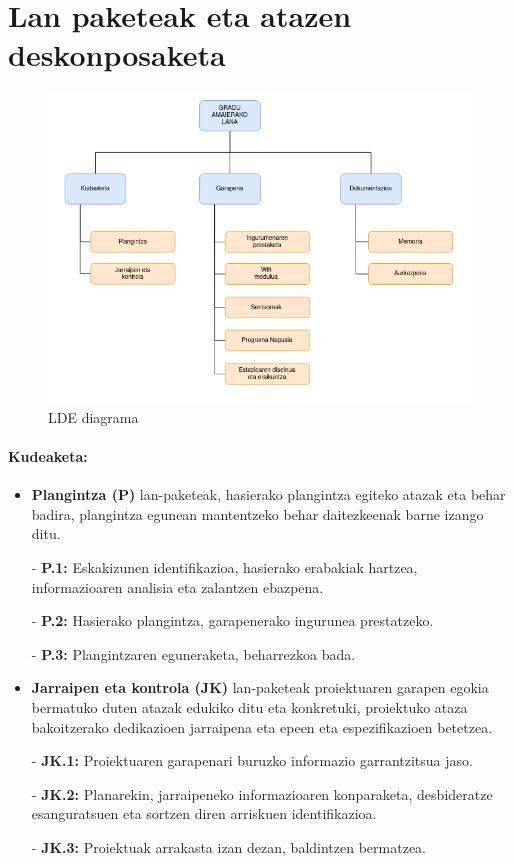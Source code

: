 \newpage
\section{Lan paketeak eta atazen deskonposaketa}

\begin{figure}[htb]
	\centering
	\includegraphics[width=.99\linewidth]{images/LDE3.png}
	\caption{\label{fig:lde} LDE diagrama}
\end{figure}

\paragraph{\textbf{Kudeaketa:}}
\begin{itemize}
    \item \textbf{Plangintza (P)} lan-paketeak, hasierako plangintza egiteko atazak eta behar badira, plangintza egunean mantentzeko behar daitezkeenak barne izango ditu.
    
        - \textbf{P.1:} Eskakizunen identifikazioa, hasierako erabakiak hartzea, informazioaren analisia eta zalantzen ebazpena. 
        
        - \textbf{P.2:} Hasierako plangintza, garapenerako ingurunea prestatzeko.
        
        - \textbf{P.3:} Plangintzaren eguneraketa, beharrezkoa bada.
    
    \item \textbf{Jarraipen eta kontrola (JK)} lan-paketeak proiektuaren garapen egokia bermatuko duten
atazak edukiko ditu eta konkretuki, proiektuko ataza bakoitzerako dedikazioen jarraipena eta epeen eta
espezifikazioen betetzea.

        - \textbf{JK.1:} Proiektuaren garapenari buruzko informazio garrantzitsua jaso.
        
        - \textbf{JK.2:} Planarekin, jarraipeneko informazioaren konparaketa, desbideratze esanguratsuen
eta sortzen diren arriskuen identifikazioa.
        
        - \textbf{JK.3:} Proiektuak arrakasta izan dezan, baldintzen bermatzea.
\end{itemize}

